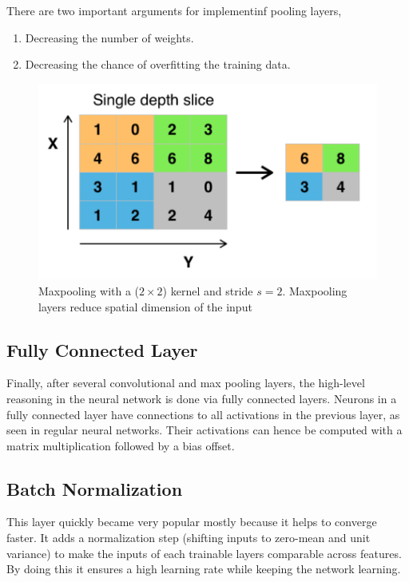     There are two important arguments for implementinf pooling layers,
    \begin{enumerate}
        \item Decreasing the number of weights.
        \item Decreasing the chance of overfitting the training data.
    \end{enumerate}
    \begin{figure}[!h]
        \centering
        \includegraphics[scale=0.5]{Figures/Max_pooling.pdf}
        \caption{Maxpooling with a ($2\times 2$) kernel and stride $s=2$. Maxpooling layers reduce spatial dimension of the input \cite{li2015convolutional}}
        \label{maxpooling}
    \end{figure}

    \subsection{Fully Connected Layer}
    Finally, after several convolutional and max pooling layers, the high-level reasoning in the neural network is done via fully connected layers. Neurons in a fully connected layer have connections to all activations in the previous layer, as seen in regular neural networks. Their activations can hence be computed with a matrix multiplication followed by a bias offset. 

    \subsection{Batch Normalization}
    \label{batchnor}
    This layer quickly became very popular mostly because it helps to converge faster\cite{ioffe2015batch}. It adds a normalization step (shifting inputs to zero-mean and unit variance) to make the inputs of each trainable layers comparable across features. By doing this it ensures a high learning rate while keeping the network learning. \\

